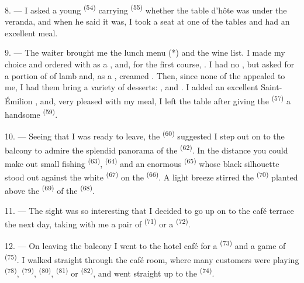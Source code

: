 8. --- I asked a young  \textsuperscript{(54)} carrying
 \textsuperscript{(55)} whether the table d'hôte was under the
veranda, and when he said it was, I took a seat at one of the tables and had an excellent
meal.


\VUsaut{4.0mm}
\VUsaut{3.0mm}

9. --- The waiter brought me the lunch menu (*) and the wine list. I made my choice and
ordered  with  as a
, and, for the first course, . I had
no , but asked for a portion of  of lamb and, as a
, creamed . Then, since none of the
 appealed to me, I had them bring a variety of desserts:
,  and . I added an excellent
Saint-Émilion , and, very pleased with my meal, I left the table after giving the
 \textsuperscript{(57)} a handsome  \textsuperscript{(59)}.

10. --- Seeing that I was ready to leave, the  \textsuperscript{(60)}
suggested I step out on to the balcony to admire the splendid panorama of the 
\textsuperscript{(62)}. In the distance you could make out small fishing 
\textsuperscript{(63)},  \textsuperscript{(64)} and an enormous
 \textsuperscript{(65)} whose black silhouette stood out against the white
 \textsuperscript{(67)} on the  \textsuperscript{(66)}. A light
breeze stirred the  \textsuperscript{(70)} planted above the
 \textsuperscript{(69)} of the  \textsuperscript{(68)}.

\VUsaut{3.0mm}
\VUsaut{3.0mm}

11. --- The sight was so interesting that I decided to go up on to the café terrace the next
day, taking with me a pair of  \textsuperscript{(71)} or a
 \textsuperscript{(72)}.

12. --- On leaving the balcony I went to the hotel café for a
 \textsuperscript{(73)} and a game of  \textsuperscript{(75)}. I
walked straight through the café room, where many customers were playing
 \textsuperscript{(78)},  \textsuperscript{(79)},
 \textsuperscript{(80)},  \textsuperscript{(81)} or
 \textsuperscript{(82)}, and went straight up to the
 \textsuperscript{(74)}.

